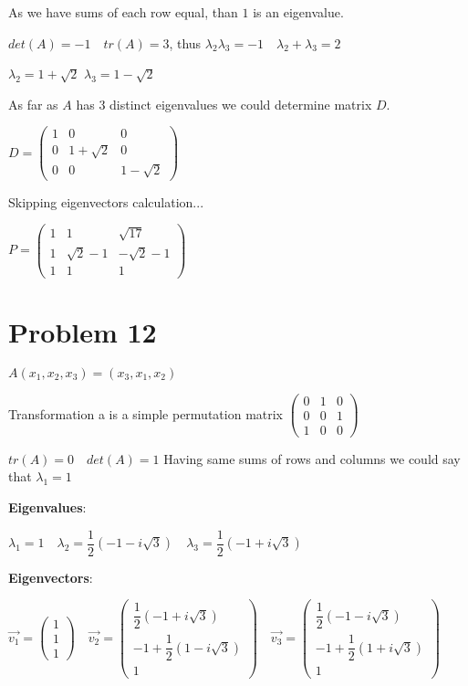 \documentclass[12pt,letterpaper]{article}
\begin{document}
As we have sums of each row equal, than $1$ is an eigenvalue.

$det(A) = -1\quad tr(A) = 3$, thus $\lambda_2\lambda_3 = -1\quad \lambda_2 + \lambda_3 = 2$

$\lambda_2 = 1 + \sqrt{2}$ $\lambda_3 = 1 - \sqrt{2}$

As far as $A$ has 3 distinct eigenvalues we could determine matrix $D$.

$D = \begin{pmatrix}
            1 & 0 & 0 \\
            0 & 1 + \sqrt{2} & 0 \\
            0 & 0 & 1 - \sqrt{2}
        \end{pmatrix}$

Skipping eigenvectors calculation...

$P = \begin{pmatrix}
            1 & 1 & \sqrt{17} \\
            1 & \sqrt{2} - 1 & -\sqrt{2} - 1 \\
            1 & 1 & 1
        \end{pmatrix}$
        
\section*{Problem 12}

$A(x_1, x_2, x_3) = (x_3, x_1, x_2)$

Transformation a is a simple permutation matrix $\begin{pmatrix}
            0 & 1 & 0 \\
            0 & 0 & 1 \\
            1 & 0 & 0
        \end{pmatrix}$
        
$tr(A) = 0\quad det(A) = 1$ Having same sums of rows and columns we could say that $\lambda_1 = 1$
        
\textbf{Eigenvalues}:

$\lambda_1 = 1 \quad \lambda_2 = \dfrac{1}{2}(-1 - i\sqrt{3}) \quad \lambda_3 = \dfrac{1}{2}(-1 + i\sqrt{3})$

\textbf{Eigenvectors}:

$\vec{v_1} = \begin{pmatrix}
            1\\
            1\\
            1
        \end{pmatrix} \quad \vec{v_2} = \begin{pmatrix}
            \dfrac{1}{2}(-1 + i\sqrt{3})\\
            -1 + \dfrac{1}{2}(1 - i\sqrt{3})\\
            1
        \end{pmatrix} \quad \vec{v_3} = \begin{pmatrix}
            \dfrac{1}{2}(-1 - i\sqrt{3})\\
            -1 + \dfrac{1}{2}(1 + i\sqrt{3})\\
            1
        \end{pmatrix}$
\end{document}
